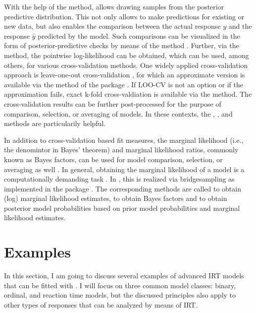 \documentclass[
]{jss}
\begin{document}
With the help of the  method,  allows
drawing samples from the posterior predictive distribution. This not
only allows to make predictions for existing or new data, but also
enables the comparison between the actual response \(y\) and the
response \(\hat{y}\) predicted by the model. Such comparisons can be
visualized in the form of posterior-predictive checks by means of the
 method \citep{gabry2019}. Further, via the
 method, the pointwise log-likelihood can be obtained,
which can be used, among others, for various cross-validation methods.
One widely applied cross-validation approach is leave-one-out
cross-validation \citep[LOO-CV;][]{vehtari2017loo}, for which an
approximate version is available via the  method of the
 package \citep{vehtari2017loo, vehtari2017psis}. If LOO-CV is
not an option or if the approximation fails, exact k-fold
cross-valdiation is available via the  method. The
cross-validation results can be further post-processed for the purpose
of comparison, selection, or averaging of models. In these contexts, the
, , and  methods
are particularily helpful.

In addition to cross-validation based fit measures, the marginal
likelihood (i.e., the denomintor in Bayes' theorem) and marginal
likelihood ratios, commonly known as Bayes factors, can be used for
model comparison, selection, or averaging as well \citep{kass1995}. In
general, obtaining the marginal likelihood of a model is a
computationally demanding task \citep{kass1995}. In , this is
realized via bridgesampling \citep{meng1996, meng2002} as implemented in
the  package \citep{bridgesampling}. The
corresponding methods are called  to obtain (log)
marginal likelihood estimates,  to obtain Bayes
factors and  to obtain posterior model probabilities
based on prior model probabilities and marginal likelihood estimates.

\hypertarget{examples}{%
\section{Examples}\label{examples}}

In this section, I am going to discuss several examples of advanced IRT
models that can be fitted with . I will focus on three common
model classes: binary, ordinal, and reaction time models, but the
discussed principles also apply to other types of responses that can be
analyzed by means of IRT.
\end{document}
